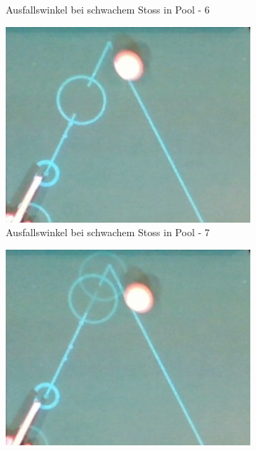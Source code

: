 \begin{figure}[h!]
\begin{subfigure}[b]{0.2\textwidth}
        \caption{Ausfallswinkel bei schwachem Stoss in Pool - 6}
        \label{fig:rebound_angle_slow_pool_6}
    \end{subfigure}
    \hfill
    \begin{subfigure}[b]{0.2\textwidth}
        \centering
        \includegraphics[width=1.0\linewidth]{../common/04_results/resources/simulation/rebound_angle_slow_pool/00_rail_rebound_angle_slow_pool_07.png}
        \caption{Ausfallswinkel bei schwachem Stoss in Pool - 7}
        \label{fig:rebound_angle_slow_pool_7}
    \end{subfigure}
    \hfill
    \begin{subfigure}[b]{0.2\textwidth}
        \centering
        \includegraphics[width=1.0\linewidth]{../common/04_results/resources/simulation/rebound_angle_slow_pool/00_rail_rebound_angle_slow_pool_08.png}

\end{subfigure}
\end{figure}
